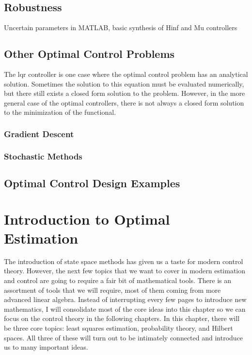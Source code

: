 \section{Robustness}
Uncertain parameters in MATLAB, basic synthesis of Hinf and Mu controllers

\section{Other Optimal Control Problems}

The \gls{lqr} controller is one case where the optimal control problem has an analytical solution. Sometimes the solution to this equation must be evaluated numerically, but there still exists a closed form solution to the problem. However, in the more general case of the optimal controllers, there is not always a closed form solution to the minimization of the functional. 

\subsection{Gradient Descent}

\subsection{Stochastic Methods}


\section{Optimal Control Design Examples}

\newpage
\printendnotes



\chapter{Introduction to Optimal Estimation}\label{chap:intro optimal est}
The introduction of state space methods has given us a taste for modern control theory. However, the next few topics that we want to cover in modern estimation and control are going to require a fair bit of mathematical tools. There is an assortment of tools that we will require, most of them coming from more advanced linear algebra. Instead of interrupting every few pages to introduce new mathematics, I will consolidate most of the core ideas into this chapter so we can focus on the control theory in the following chapters. In this chapter, there will be three core topics: least squares estimation, probability theory, and Hilbert spaces. All three of these will turn out to be intimately connected and introduce us to many important ideas.

